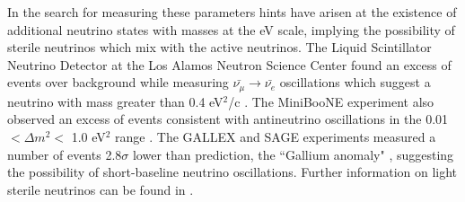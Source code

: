 In the search for measuring these parameters hints have arisen at the existence of additional neutrino states with masses at the eV scale, implying the possibility of sterile neutrinos which mix with the active neutrinos.
The Liquid Scintillator Neutrino Detector at the Los Alamos Neutron Science Center found an excess of events over background while measuring $\bar{\nu_\mu} \rightarrow \bar{\nu_e}$ oscillations which suggest a neutrino with mass greater than 0.4 eV$^2$/c \cite{Aguilar:2001ty}.
The MiniBooNE experiment also observed an excess of events consistent with antineutrino oscillations in the 0.01 $< \Delta m^2 <$ 1.0 eV$^2$ range \cite{AguilarArevalo:2008rc,AguilarArevalo:2010wv,PhysRevLett.110.161801}.
The GALLEX \cite{1998114, KAETHER201047} and SAGE \cite{PhysRevC.59.2246,PhysRevC.73.045805,PhysRevC.80.015807} experiments measured a number of events 2.8$\sigma$ lower than prediction, the ``Gallium anomaly" \cite{PhysRevC.83.065504,PhysRevD.82.053005}, suggesting the possibility of short-baseline neutrino oscillations.
Further information on light sterile neutrinos can be found in \cite{Abazajian:2012ys}.



